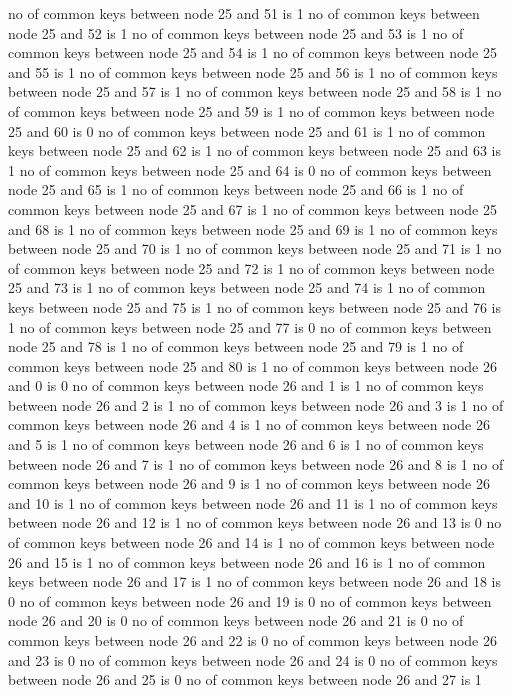 no of common keys between node 25 and 51 is 1
no of common keys between node 25 and 52 is 1
no of common keys between node 25 and 53 is 1
no of common keys between node 25 and 54 is 1
no of common keys between node 25 and 55 is 1
no of common keys between node 25 and 56 is 1
no of common keys between node 25 and 57 is 1
no of common keys between node 25 and 58 is 1
no of common keys between node 25 and 59 is 1
no of common keys between node 25 and 60 is 0
no of common keys between node 25 and 61 is 1
no of common keys between node 25 and 62 is 1
no of common keys between node 25 and 63 is 1
no of common keys between node 25 and 64 is 0
no of common keys between node 25 and 65 is 1
no of common keys between node 25 and 66 is 1
no of common keys between node 25 and 67 is 1
no of common keys between node 25 and 68 is 1
no of common keys between node 25 and 69 is 1
no of common keys between node 25 and 70 is 1
no of common keys between node 25 and 71 is 1
no of common keys between node 25 and 72 is 1
no of common keys between node 25 and 73 is 1
no of common keys between node 25 and 74 is 1
no of common keys between node 25 and 75 is 1
no of common keys between node 25 and 76 is 1
no of common keys between node 25 and 77 is 0
no of common keys between node 25 and 78 is 1
no of common keys between node 25 and 79 is 1
no of common keys between node 25 and 80 is 1
no of common keys between node 26 and 0 is 0
no of common keys between node 26 and 1 is 1
no of common keys between node 26 and 2 is 1
no of common keys between node 26 and 3 is 1
no of common keys between node 26 and 4 is 1
no of common keys between node 26 and 5 is 1
no of common keys between node 26 and 6 is 1
no of common keys between node 26 and 7 is 1
no of common keys between node 26 and 8 is 1
no of common keys between node 26 and 9 is 1
no of common keys between node 26 and 10 is 1
no of common keys between node 26 and 11 is 1
no of common keys between node 26 and 12 is 1
no of common keys between node 26 and 13 is 0
no of common keys between node 26 and 14 is 1
no of common keys between node 26 and 15 is 1
no of common keys between node 26 and 16 is 1
no of common keys between node 26 and 17 is 1
no of common keys between node 26 and 18 is 0
no of common keys between node 26 and 19 is 0
no of common keys between node 26 and 20 is 0
no of common keys between node 26 and 21 is 0
no of common keys between node 26 and 22 is 0
no of common keys between node 26 and 23 is 0
no of common keys between node 26 and 24 is 0
no of common keys between node 26 and 25 is 0
no of common keys between node 26 and 27 is 1
